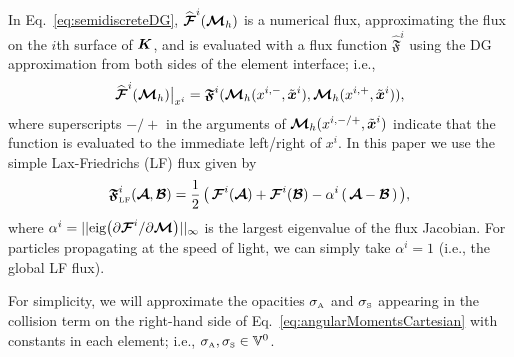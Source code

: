 In Eq.~\eqref{eq:semidiscreteDG}, $\widehat{\boldsymbol{\mathcal{F}}}^{i}(\boldsymbol{\mathcal{M}}_{h})$ is a numerical flux, approximating the flux on the $i$th surface of $\boldsymbol{K}$, and is evaluated with a flux function $\widehat{\mathfrak{F}}^{i}$ using the DG approximation from both sides of the element interface; i.e.,
\begin{equation}
  \widehat{\boldsymbol{\mathcal{F}}}^{i}(\boldsymbol{\mathcal{M}}_{h})\big|_{x^{i}}=\boldsymbol{\mathfrak{F}}^{i}(\boldsymbol{\mathcal{M}}_{h}(x^{i,-},\tilde{\boldsymbol{x}}^{i}),\boldsymbol{\mathcal{M}}_{h}(x^{i,+},\tilde{\boldsymbol{x}}^{i})),
\end{equation}
where superscripts $-/+$ in the arguments of $\boldsymbol{\mathcal{M}}_{h}(x^{i,-/+},\tilde{\boldsymbol{x}}^{i})$ indicate that the function is evaluated to the immediate left/right of $x^{i}$.  
In this paper we use the simple Lax-Friedrichs (LF) flux given by
\begin{equation}
  \boldsymbol{\mathfrak{F}}_{\mbox{\tiny LF}}^{i}(\boldsymbol{\mathcal{A}},\boldsymbol{\mathcal{B}})
  =\frac{1}{2}\,\big(\,\boldsymbol{\mathcal{F}}^{i}(\boldsymbol{\mathcal{A}})+\boldsymbol{\mathcal{F}}^{i}(\boldsymbol{\mathcal{B}})-\alpha^{i}\,(\,\boldsymbol{\mathcal{A}}-\boldsymbol{\mathcal{B}}\,)\,\big),
\end{equation}
where $\alpha^{i}=||\mbox{eig}\big(\partial\boldsymbol{\mathcal{F}}^{i}/\partial\boldsymbol{\mathcal{M}}\big)||_{\infty}$ is the largest eigenvalue of the flux Jacobian.  
For particles propagating at the speed of light, we can simply take $\alpha^{i}=1$ (i.e., the global LF flux).  

For simplicity, we will approximate the opacities $\sigma_{\mbox{\tiny A}}$ and $\sigma_{\mbox{\tiny S}}$ appearing in the collision term on the right-hand side of Eq.~\eqref{eq:angularMomentsCartesian} with constants in each element; i.e., $\sigma_{\mbox{\tiny A}},\sigma_{\mbox{\tiny S}}\in\mathbb{V}^{0}$.  